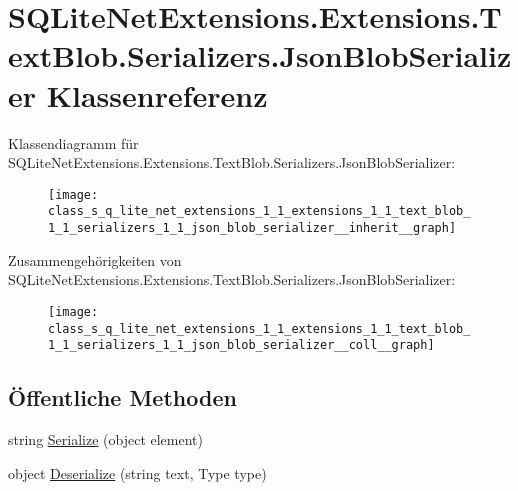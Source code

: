 \hypertarget{class_s_q_lite_net_extensions_1_1_extensions_1_1_text_blob_1_1_serializers_1_1_json_blob_serializer}{}\section{S\+Q\+Lite\+Net\+Extensions.\+Extensions.\+Text\+Blob.\+Serializers.\+Json\+Blob\+Serializer Klassenreferenz}
\label{class_s_q_lite_net_extensions_1_1_extensions_1_1_text_blob_1_1_serializers_1_1_json_blob_serializer}


Klassendiagramm für S\+Q\+Lite\+Net\+Extensions.\+Extensions.\+Text\+Blob.\+Serializers.\+Json\+Blob\+Serializer\+:\nopagebreak
\begin{figure}[H]
\begin{center}
\leavevmode
\texttt{[image: class\_s\_q\_lite\_net\_extensions\_1\_1\_extensions\_1\_1\_text\_blob\_1\_1\_serializers\_1\_1\_json\_blob\_serializer\_\_inherit\_\_graph]}
\end{center}
\end{figure}


Zusammengehörigkeiten von S\+Q\+Lite\+Net\+Extensions.\+Extensions.\+Text\+Blob.\+Serializers.\+Json\+Blob\+Serializer\+:\nopagebreak
\begin{figure}[H]
\begin{center}
\leavevmode
\texttt{[image: class\_s\_q\_lite\_net\_extensions\_1\_1\_extensions\_1\_1\_text\_blob\_1\_1\_serializers\_1\_1\_json\_blob\_serializer\_\_coll\_\_graph]}
\end{center}
\end{figure}
\subsection*{Öffentliche Methoden}
\begin{DoxyCompactItemize}
\item 
string \mbox{\hyperlink{class_s_q_lite_net_extensions_1_1_extensions_1_1_text_blob_1_1_serializers_1_1_json_blob_serializer_ab8efea2b436de4940db88ec2f224b85f}{Serialize}} (object element)
\item 
object \mbox{\hyperlink{class_s_q_lite_net_extensions_1_1_extensions_1_1_text_blob_1_1_serializers_1_1_json_blob_serializer_a9d0b3ea894c5a047b15bff731c25c82f}{Deserialize}} (string text, Type type)
\end{DoxyCompactItemize}


